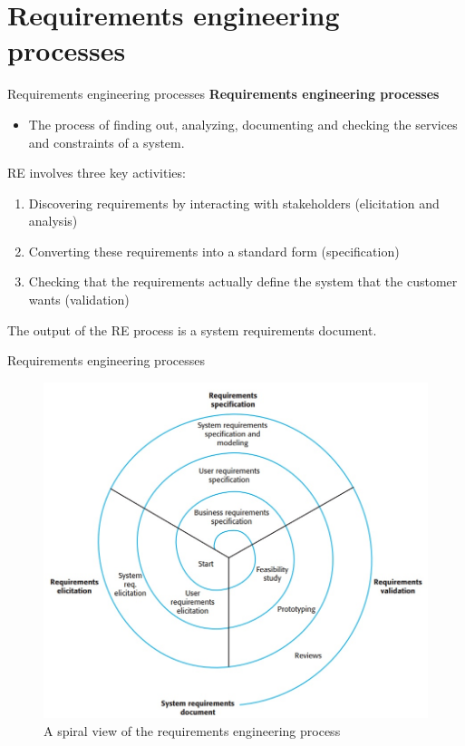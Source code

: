 \documentclass{beamer}
\begin{document}
\section{Requirements engineering processes}
\begin{frame}{Requirements engineering processes}
	\textbf{Requirements engineering processes}
	\begin{itemize}
		\item The process of finding out, analyzing, documenting and checking the services 
		and constraints of a system.
	\end{itemize}
RE involves three key activities:
\begin{enumerate}
	\item Discovering requirements by interacting with stakeholders (elicitation and analysis)
	\item Converting these requirements into a standard form (specification)
	\item Checking that the requirements actually define the system that the 
	customer wants (validation)
\end{enumerate}
The output of the RE process is a system requirements document.
\end{frame}
\begin{frame}{Requirements engineering processes}
	
	\begin{figure}
	\includegraphics[scale=.45]{img/m2_5.jpg}
	\caption{A spiral view 
		of the requirements 
		engineering process}
\end{figure}
\end{frame}
\end{document}
